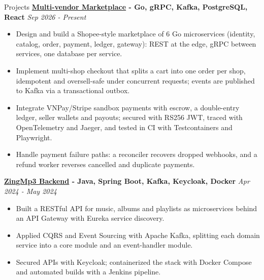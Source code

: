 \documentclass{resume} %
\begin{document}
\begin{rSection}{Projects}
    {\bf \href{https://github.com/ngoxuanchien/E-Commerce}{Multi-vendor Marketplace} - Go, gRPC, Kafka, PostgreSQL, React} \hfill {\em Sep 2026 - Present}

    \begin{itemize}
        \item Design and build a Shopee-style marketplace of 6 Go microservices (identity, catalog, order, payment, ledger, gateway): REST at the edge, gRPC between services, one database per service.
        \item Implement multi-shop checkout that splits a cart into one order per shop, idempotent and oversell-safe under concurrent requests; events are published to Kafka via a transactional outbox.
        \item Integrate VNPay/Stripe sandbox payments with escrow, a double-entry ledger, seller wallets and payouts; secured with RS256 JWT, traced with OpenTelemetry and Jaeger, and tested in CI with Testcontainers and Playwright.
        \item Handle payment failure paths: a reconciler recovers dropped webhooks, and a refund worker reverses cancelled and duplicate payments.
    \end{itemize}

    {\bf \href{https://github.com/ngoxuanchien/ZingMp3}{ZingMp3 Backend} - Java, Spring Boot, Kafka, Keycloak, Docker} \hfill {\em Apr 2024 - May 2024}

    \begin{itemize}
        \item Built a RESTful API for music, albums and playlists as microservices behind an API Gateway with Eureka service discovery.
        \item Applied CQRS and Event Sourcing with Apache Kafka, splitting each domain service into a core module and an event-handler module.
        \item Secured APIs with Keycloak; containerized the stack with Docker Compose and automated builds with a Jenkins pipeline.
    \end{itemize}

\end{rSection}
\end{document}
